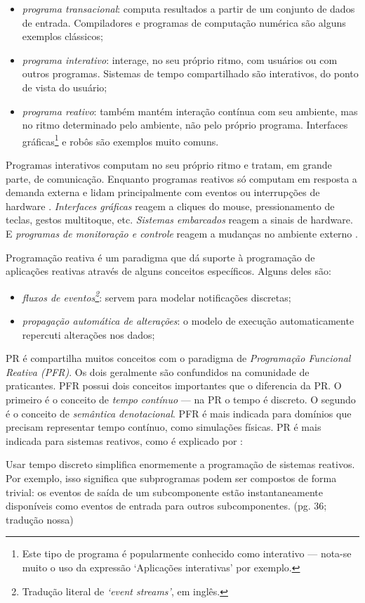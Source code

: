 \begin{itemize}
\item \emph{programa transacional}: computa resultados a partir de um conjunto de dados
de entrada. Compiladores e programas de computação numérica são alguns
exemplos clássicos;
\item \emph{programa interativo}: interage, no seu próprio ritmo, com usuários ou com
outros programas. Sistemas de tempo compartilhado são interativos, do ponto
de vista do usuário;
\item \emph{programa reativo}: também mantém interação contínua com seu ambiente, mas
no ritmo determinado pelo ambiente, não pelo próprio programa. Interfaces
gráficas\footnote{Este tipo de programa é popularmente conhecido como interativo — nota-se muito o
uso da expressão ‘Aplicações interativas’ por exemplo.} e robôs são exemplos muito comuns.
\end{itemize}

Programas interativos computam no seu próprio ritmo e tratam, em grande parte,
de comunicação.
Enquanto programas reativos só computam em resposta a demanda externa e lidam
principalmente com eventos ou interrupções de hardware \cite{berry1989}.
\emph{Interfaces gráficas} reagem a cliques do mouse, pressionamento de teclas,
gestos multitoque, etc.
\emph{Sistemas embarcados} reagem a sinais de hardware.
E \emph{programas de monitoração e controle} reagem a mudanças no ambiente externo
\cite{salvaneschi2015}.

Programação reativa é um paradigma que dá suporte à programação de aplicações
reativas através de alguns conceitos específicos.
Alguns deles são:

\begin{itemize}
\item \emph{fluxos de eventos\footnote{Tradução literal de \emph{‘event streams’}, em inglês.}}: servem para modelar notificações
discretas;
\item \emph{propagação automática de alterações}: o modelo de execução automaticamente
repercuti alterações nos dados;
\end{itemize}

PR é compartilha muitos conceitos com o paradigma de \emph{Programação Funcional
Reativa (PFR)}.
Os dois geralmente são confundidos na comunidade de praticantes.
PFR possui dois conceitos importantes que o diferencia da PR.
O primeiro é o conceito de \emph{tempo contínuo} — na PR o tempo é discreto.
O segundo é o conceito de \emph{semântica denotacional}.
PFR é mais indicada para domínios que precisam representar tempo contínuo,
como simulações físicas.
PR é mais indicada para sistemas reativos, como é explicado por
\textcite{roy2009}:

\begin{citacao}
  Usar tempo discreto simplifica enormemente a programação de sistemas reativos.
  Por exemplo, isso significa que subprogramas podem ser compostos de forma
  trivial: os eventos de saída de um subcomponente estão instantaneamente
  disponíveis como eventos de entrada para outros subcomponentes.
  (pg. 36; tradução nossa)
\end{citacao}
